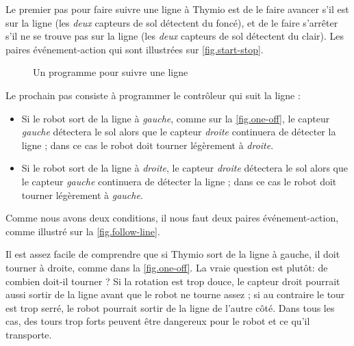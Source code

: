 Le premier pas pour faire suivre une ligne à Thymio est de le faire avancer s'il est sur la ligne (les \emph{deux} capteurs de sol détectent du foncé), et de le faire s'arrêter s'il ne se trouve pas sur la ligne (les \emph{deux} capteurs de sol détectent du clair).
Les paires événement-action qui sont illustrées sur \cref{fig.start-stop}.


\begin{figure}
	\hfill
	\caption{Un programme pour suivre une ligne}
\end{figure}


Le prochain pas consiste à programmer le contrôleur qui suit la ligne :

\begin{itemize}
	\item Si le robot sort de la ligne à \emph{gauche}, comme sur la \cref{fig.one-off}, le capteur \emph{gauche} détectera le sol alors que le capteur \emph{droite} continuera de détecter la ligne ; dans ce cas le robot doit tourner légèrement à \emph{droite}.

	\item Si le robot sort de la ligne à \emph{droite}, le capteur \emph{droite} détectera le sol alors que le capteur \emph{gauche} continuera de détecter la ligne ; dans ce cas le robot doit tourner légèrement à \emph{gauche}.
	
\end{itemize}

Comme nous avons deux conditions, il nous faut deux paires événement-action, comme illustré sur la \cref{fig.follow-line}.


Il est assez facile de comprendre que si Thymio sort de la ligne à gauche, il doit tourner à droite, comme dans la \cref{fig.one-off}.
La vraie question est plutôt: de combien doit-il tourner ?
Si la rotation est trop douce, le capteur droit pourrait aussi sortir de la ligne avant que le robot ne tourne assez ; si au contraire le tour est trop serré, le robot pourrait sortir de la ligne de l'autre côté.
Dans tous les cas, des tours trop forts peuvent être dangereux pour le robot et ce qu'il transporte.

